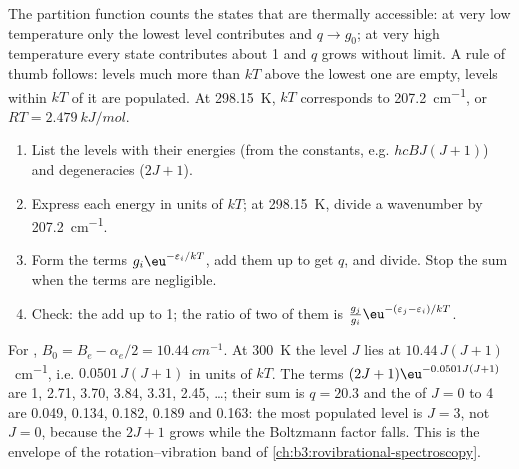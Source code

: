 The partition function counts the states that are thermally accessible: at
very low temperature only the lowest level contributes and $q \to g_0$; at very
high temperature every state contributes about 1 and $q$ grows without limit.
A rule of thumb follows: levels much more than $kT$ above the lowest one are
empty, levels within $kT$ of it are populated. At \qty{298.15}{K}, $kT$ corresponds
to \qty{207.2}{cm^{-1}}, or $RT = \qty{2.479}{kJ/mol}$.

\begin{method}\label{met:b3:partition-functions:populations}
\begin{enumerate}
  \item List the levels with their energies (from the constants, e.g.
        $hcBJ(J+1)$) and degeneracies ($2J + 1$).
  \item Express each energy in units of $kT$; at \qty{298.15}{K}, divide a
        wavenumber by \qty{207.2}{cm^{-1}}.
  \item Form the terms $g_i\eu^{-\varepsilon_i/kT}$, add them up to get $q$, and divide.
        Stop the sum when the terms are negligible.
  \item Check: the  add up to 1; the ratio of two of them is
        $\frac{g_j}{g_i}\eu^{-(\varepsilon_j-\varepsilon_i)/kT}$.
\end{enumerate}
\end{method}

\begin{example}\label{ex:b3:partition-functions:hcl}
For , $B_0 = B_e - \alpha_e/2 = \qty{10.44}{cm^{-1}}$. At \qty{300}{K} the level $J$
lies at $10.44\,J(J+1)$~\unit{cm^{-1}}, i.e. $0.0501\,J(J+1)$ in units of $kT$. The terms
$(2J+1)\eu^{-0.0501J(J+1)}$ are 1, 2.71, 3.70, 3.84, 3.31, 2.45, \dots; their sum is
$q = 20.3$ and the  of $J = 0$ to 4 are 0.049, 0.134, 0.182, 0.189 and
0.163: the most populated level is $J = 3$, not $J = 0$, because the 
$2J + 1$ grows while the Boltzmann factor falls. This is the envelope of the
rotation--vibration band of \cref{ch:b3:rovibrational-spectroscopy}.
\end{example}

